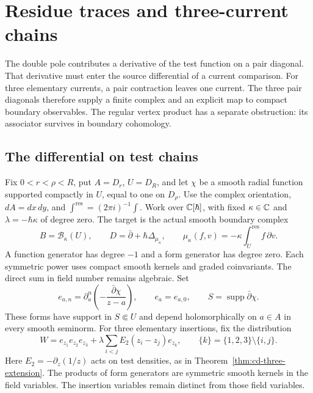 \chapter{Residue traces and three-current chains}
\label{chap:collision-chains}

The double pole contributes a derivative of the test function on a pair
diagonal.  That derivative must enter the source differential of a current
comparison.  For three elementary currents, a pair contraction leaves one
current.  The three pair diagonals therefore supply a finite complex and an
explicit map to compact boundary observables.  The regular vertex product
has a separate obstruction: its associator survives in boundary cohomology.

\section{The differential on test chains}

Fix $0<r<\rho<R$, put $A=D_r$, $U=D_R$, and let $\chi$ be a smooth
radial function supported compactly in $U$, equal to one on $D_\rho$.
Use the complex orientation, $dA=dx\,dy$, and
$\int^{\mathrm{res}}=(2\pi i)^{-1}\int$.
Work over $\mathbb C[\hbar]$, with fixed $\kappa\in\mathbb C$ and
$\lambda=-\hbar\kappa$ of degree zero.
The target is the actual smooth boundary complex
\[
 B=\mathcal B_\kappa(U),\qquad
 D=\bar\partial+\hbar\Delta_{\mu_\kappa},\qquad
 \mu_\kappa(f,v)=-\kappa\int_U^{\mathrm{res}}f\,\partial v.
\]
A function generator has degree $-1$ and a form generator has degree zero.
Each symmetric power uses compact smooth kernels and graded coinvariants.
The direct sum in field number remains algebraic.
Set
\[
 e_{a,n}=\partial_a^n\left(-\frac{\bar\partial\chi}{z-a}\right),
 \qquad e_a=e_{a,0},\qquad S=\operatorname{supp}\bar\partial\chi.
\]
These forms have support in $S\Subset U$ and depend holomorphically on
$a\in A$ in every smooth seminorm.
For three elementary insertions, fix the distribution
\[
 W=e_{z_1}e_{z_2}e_{z_3}
   +\lambda\sum_{i<j}E_2(z_i-z_j)e_{z_k},
 \qquad \{k\}=\{1,2,3\}\setminus\{i,j\}.
\]
Here $E_2=-\partial_z(1/z)$ acts on test densities, as in
Theorem~\ref{thm:cd-three-extension}.  The products of form generators
are symmetric smooth kernels in the field variables.  The insertion
variables remain distinct from those field variables.

